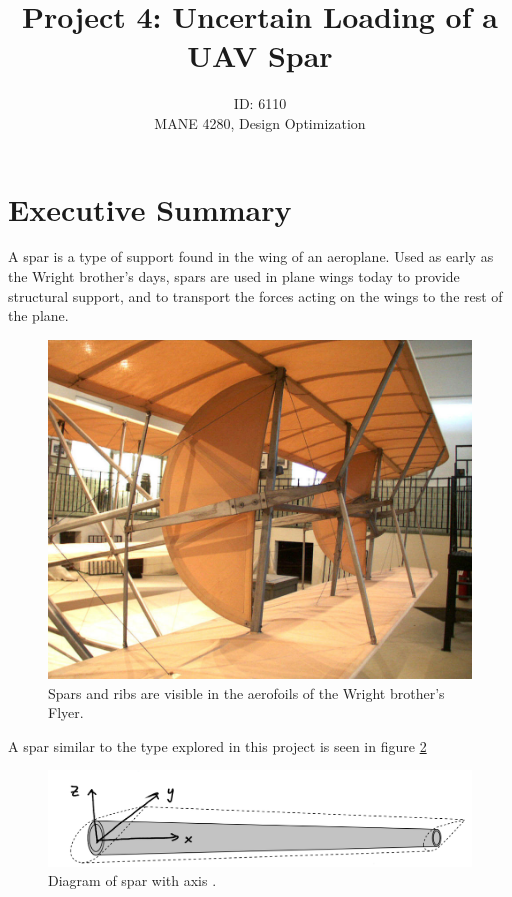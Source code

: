 \documentclass[12pt]{article}
\begin{document}
	
	
	\title{Project 4: Uncertain Loading of a UAV Spar}
	\author{ID: 6110\\ %
		 MANE 4280, Design Optimization}
	
	\maketitle
	\tableofcontents
	\thispagestyle{empty}
	\newpage
	\setcounter{page}{1}
	\section{Executive Summary}


	A spar is a type of support found in the wing of an aeroplane. Used as early as the Wright brother's days, spars are used in plane wings today to provide structural support, and to transport the forces acting on the wings to the rest of the plane. 
	
	\begin{figure}[h!]
		\centering
		\includegraphics[width=0.5\linewidth]{sparFlyer}
		\caption{Spars and ribs are visible in the aerofoils of the Wright brother's Flyer\cite{original1905wrightflyeriii}.}
		\label{fig:sparflyer}
	\end{figure}
	
	
	A spar similar to the type explored in this project is seen in figure \ref{fig:spardiagram} %
	
	\begin{figure}[h!]
	\centering
	\includegraphics[width=0.7\linewidth]{sparDiagram}
	\caption{Diagram of spar with axis \cite{Hicken18}.}
	\label{fig:spardiagram}
\end{figure}
\end{document}
